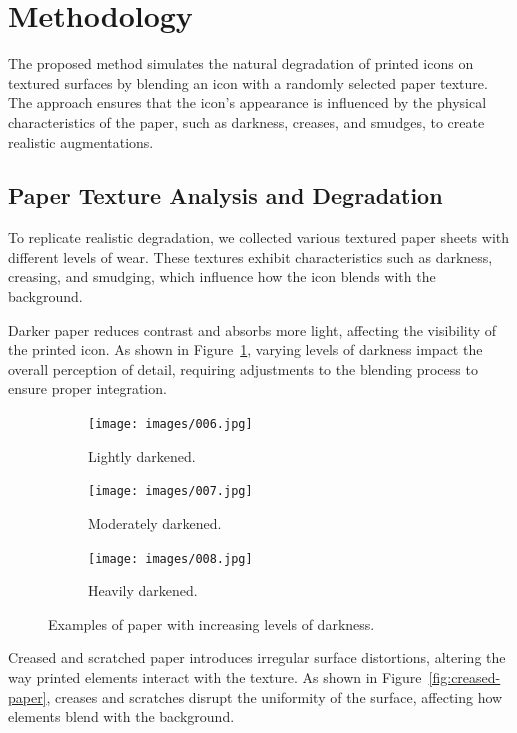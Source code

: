 \section{Methodology}\label{sec:methodology}

The proposed method simulates the natural degradation of printed icons on textured surfaces by blending an icon with a randomly selected paper texture. The approach ensures that the icon's appearance is influenced by the physical characteristics of the paper, such as darkness, creases, and smudges, to create realistic augmentations.

\subsection{Paper Texture Analysis and Degradation}

To replicate realistic degradation, we collected various textured paper sheets with different levels of wear. These textures exhibit characteristics such as darkness, creasing, and smudging, which influence how the icon blends with the background.

Darker paper reduces contrast and absorbs more light, affecting the visibility of the printed icon. As shown in Figure~\ref{fig:dark-paper}, varying levels of darkness impact the overall perception of detail, requiring adjustments to the blending process to ensure proper integration.

\begin{figure}
    \centering
    \begin{subfigure}{0.3\textwidth}
        \texttt{[image: images/006.jpg]}
        \caption{Lightly darkened.}
    \end{subfigure}
    \begin{subfigure}{0.3\textwidth}
        \texttt{[image: images/007.jpg]}
        \caption{Moderately darkened.}
    \end{subfigure}
    \begin{subfigure}{0.3\textwidth}
        \texttt{[image: images/008.jpg]}
        \caption{Heavily darkened.}
    \end{subfigure}
    \caption{Examples of paper with increasing levels of darkness.}\label{fig:dark-paper}
\end{figure}

Creased and scratched paper introduces irregular surface distortions, altering the way printed elements interact with the texture. As shown in Figure~\ref{fig:creased-paper}, creases and scratches disrupt the uniformity of the surface, affecting how elements blend with the background.

